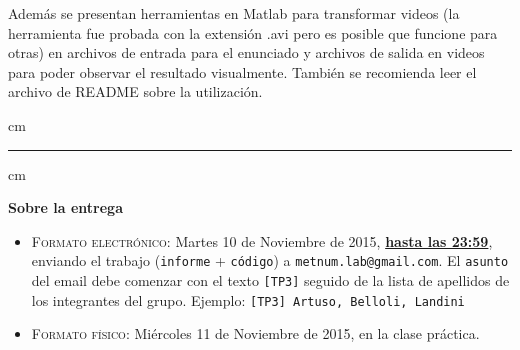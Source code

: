 Además se presentan herramientas en Matlab para transformar videos (la herramienta fue probada con la extensión .avi pero es posible que funcione para otras) en archivos de entrada para el enunciado y archivos de salida en videos para poder observar el resultado visualmente. También se recomienda leer el archivo de README sobre la utilización.


 cm
\hrule
{} cm

{\bf Sobre la entrega}
\begin{itemize}
\item \textsc{Formato electr\'onico:} Martes 10 de Noviembre de 2015, {\bf{\underline{hasta las 23:59}}}, enviando el trabajo
(\texttt{informe} + \texttt{c\'odigo}) a \texttt{metnum.lab@gmail.com}. El \texttt{asunto} del email debe comenzar con el texto \verb|[TP3]| seguido
de la lista de apellidos de los integrantes del grupo. Ejemplo: \texttt{[TP3] Artuso, Belloli, Landini}
\item \textsc{Formato f\'isico:} Mi\'ercoles 11 de Noviembre de 2015, en la clase pr\'actica.
\end{itemize}


%